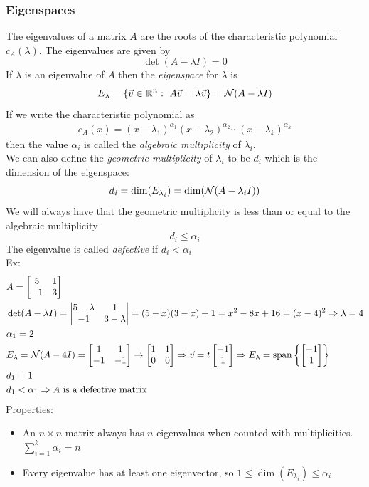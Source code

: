 \documentclass[11pt, fleqn]{article}
\begin{document}
\subsubsection{Eigenspaces}
The eigenvalues of a matrix $A$ are the roots of the characteristic polynomial $c_A(\lambda)$. The eigenvalues are given by
$$\det(A-\lambda I)=0$$
If $\lambda$ is an eigenvalue of $A$ then the \textit{eigenspace} for $\lambda$ is
$$E_\lambda=\brcurly{\vec{v}\in\R^n:\ A\vec{v}=\lambda\vec{v}}=\Null(A-\lambda I)$$
If we write the characteristic polynomial as
\begin{align*}
    c_A(x)=(x-\lambda_1)^{\alpha_1}(x-\lambda_2)^{\alpha_2}\cdots(x-\lambda_k)^{\alpha_k}
\end{align*}
then the value $\alpha_i$ is called the \textit{algebraic multiplicity} of $\lambda_i$.\\
We can also define the \textit{geometric multiplicity} of $\lambda_i$ to be $d_i$ which is the dimension of the eigenspace:
$$d_i=\dim(E_{\lambda_i})=\dim(\mathcal{N}(A-\lambda_iI))$$
We will always have that the geometric multiplicity is less than or equal to the algebraic multiplicity
$$d_i\leq\alpha_i$$
The eigenvalue is called \textit{defective} if $d_i<\alpha_i$\\
Ex:
\begin{align*}
    &A=\matrixx{5 & 1\\ -1 & 3}\\
    &\det(A-\lambda I)=\detmatrix{5-\lambda & 1\\ -1 & 3-\lambda}=(5-x)(3-x)+1=x^2-8x+16=(x-4)^2\Ra \lambda=4\\
    &\alpha_1=2\\
    &E_{\lambda}=\Null(A-4I)=\matrixx{1 & 1\\ -1 & -1}\to\matrixx{1 & 1\\ 0 & 0}\Ra \vec{v}=t\matrixx{-1\\1}\Ra E_\lambda=\spann\brcurly{\matrixx{-1\\1}}\\
    &d_1=1\\
    &d_1<\alpha_1\Ra \text{$A$ is a defective matrix}
\end{align*}
Properties:
\begin{itemize}
    \item An $n\times n$ matrix always has $n$ eigenvalues when counted with multiplicities. $\sum\limits_{i=1}^k\alpha_i=n$
    \item Every eigenvalue has at least one eigenvector, so $1\leq\dim(E_{\lambda_i})\leq \alpha_i$
\end{itemize}
\end{document}

